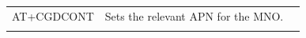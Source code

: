 \documentclass[]{article}
\makeatletter
\newcounter{tableno}
\newenvironment{tablenos:no-prefix-table-caption}{
    \caption@ifcompatibility{}{
    \let\oldthetable\thetable
    \let\oldtheHtable\theHtable
    \renewcommand{\thetable}{tableno:\thetableno}
    \renewcommand{\theHtable}{tableno:\thetableno}
    \stepcounter{tableno}
    \captionsetup{labelformat=empty}
    }
}{
    \caption@ifcompatibility{}{
    \captionsetup{labelformat=default}
    \let\thetable\oldthetable
    \let\theHtable\oldtheHtable
    \addtocounter{table}{-1}
    }
}
\makeatother
\begin{document}
\begin{tablenos:no-prefix-table-caption}
\begin{longtable}[]{@{}lll@{}}
\begin{minipage}[t]{0.10\columnwidth}
AT+CGDCONT\strut
\end{minipage} & \begin{minipage}[t]{0.61\columnwidth}\raggedright
Sets the relevant APN for the MNO.\strut
\end{minipage}\tabularnewline
\begin{minipage}[t]{0.20\columnwidth}\raggedright
\strut
\end{minipage} & \begin{minipage}[t]{0.10\columnwidth}\raggedright
\strut
\end{minipage} & \begin{minipage}[t]{0.61\columnwidth}\raggedright
\strut
\end{minipage}\tabularnewline
\bottomrule
\end{longtable}

\end{tablenos:no-prefix-table-caption}
\end{document}
